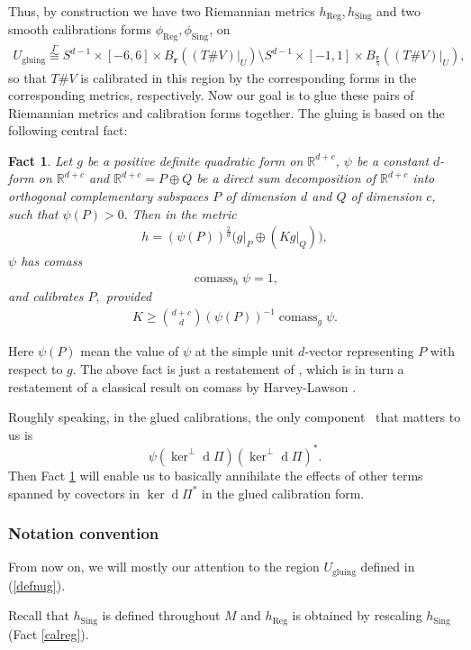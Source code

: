 \documentclass[11pt,a4paper]{amsart}
\numberwithin{equation}{section}
\newcommand{\reg}{{\operatorname{Reg}}}
\newcommand{\sing}{{\operatorname{Sing}}}
\newcommand{\Ga}{\Gamma}
\newcommand{\cms}{\operatorname{comass}}
\newcommand{\ug}{U_{\operatorname{gluing}}}
\newcommand{\kn}{\ker^\perp \ed\Pi}
\newcommand{\ed}{{\operatorname{d}}}
\newcommand{\du}{^\ast}
\newcommand{\mfr}{{\mathbf{r}}}
\newcommand{\tvu}{(T\#V)|_U}
\newcommand{\R}{\mathbb{R}}
\newcommand{\ur}{B_{\mfr}(\tvu)}
\theoremstyle{plain}
\newtheorem{fact}[exam]{Fact}
\theoremstyle{definition}
\numberwithin{equation}{subsection}
\begin{document}
	Thus, by construction
	we have two Riemannian metrics $h_\reg,h_\sing$ and two smooth calibrations forms $\phi_\reg,\phi_\sing$, on
	\begin{align}\label{defnug}
		\ug\overset{\Ga}{\cong}S^{d-1}\times[-6,6]\times \ur\setminus S^{d-1}\times [-1,1]\times B_{\frac{\mfr}{5}}(\tvu),
	\end{align}
	so that $T\#V$ is calibrated in this region by the corresponding forms in the corresponding metrics, respectively. Now our goal is to glue these pairs of Riemannian metrics and calibration forms together. 
	The gluing is based on the following central fact:
	\begin{fact}\label{calk}
		Let $g$ be a positive definite quadratic form on $\R^{d+c}$, $\psi$ be a constant $d$-form on $\R^{d+c}$ and $\R^{d+c}=P\oplus Q$ be a direct sum decomposition of $\R^{d+c}$ into orthogonal complementary subspaces $P$ of dimension $d$ and $Q$ of dimension $c$, such that $\psi(P)>0.$ Then in the metric
		\begin{align*}
			h=(\psi(P))^{\frac{2}{d}}\big(g|_P\oplus (K g|_Q)\big),
		\end{align*}$\psi$ has comass
		\begin{align*}
			\cms_{h}\psi=1,
		\end{align*} 
		and calibrates $P,$ provided
		\begin{align}\label{kge}
			K\ge \binom{d+c}{d}(\psi(P))^{-1}\cms_g\psi.
		\end{align}
	\end{fact}
	Here $\psi(P)$ mean the value of $\psi$ at the simple unit $d$-vector representing $P$ with respect to $g.$
	The above fact is just a restatement of \cite[Lemma 3.4, Remark 3.5]{YZa}, which is in turn a restatement of a classical result on comass by Harvey-Lawson \cite[Lemma 2.14]{HLf}. 
	
	Roughly speaking, in the glued calibrations, the only component  that matters to us is $$\psi(\kn)(\kn)\du.$$ Then Fact \ref{calk} will enable us to basically annihilate the effects of other terms spanned by covectors in $\ker\ed\Pi\du$ in the glued calibration form. 
	\subsubsection{Notation convention}
	From now on, we will mostly our attention to the region $\ug$ defined in (\ref{defnug}).
	
	Recall that $h_\sing$ is defined throughout $M$ and $h_\reg$ is obtained by rescaling $h_\sing$ (Fact \ref{calreg}). 
	
\end{document}
